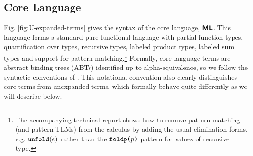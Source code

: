 \documentclass[acmsmall,screen]{acmart}
\begin{document}



\subsection{Core Language}\label{sec:s-XL}
Fig. \ref{fig:U-expanded-terms} gives the syntax of the core language, $\textsf{\textbf{ML}}$. This language forms a standard pure functional language with partial function types, quantification over types, recursive types, labeled product types, labeled sum types and support for pattern matching.\footnote{The accompanying technical report shows how to remove pattern matching  (and pattern TLMs) from the calculus by adding the usual elimination forms, e.g. $\texttt{unfold}(e)$ rather than the $\texttt{foldp}\texttt{(}p\texttt{)}$ pattern for values of recursive type.} Formally, core language terms are {abstract binding trees} (ABTs) identified up to alpha-equivalence, so we follow the syntactic conventions of \citet{pfple1}. This notational convention also clearly distinguishes core terms from unexpanded terms, which formally behave quite differently as we will describe below. 
\end{document}
